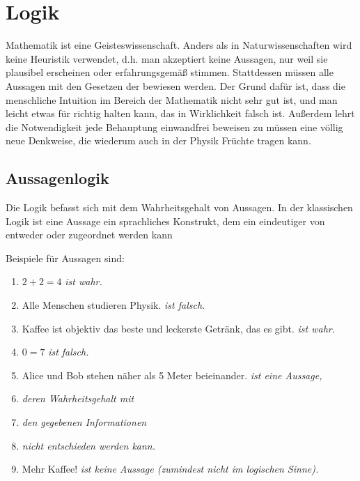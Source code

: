 \chapter{Logik}

Mathematik ist eine Geisteswissenschaft. Anders als in Naturwissenschaften wird keine Heuristik verwendet, d.h. man akzeptiert keine Aussagen, nur weil sie plausibel erscheinen oder erfahrungsgemäß stimmen. Stattdessen müssen alle Aussagen mit den Gesetzen der  bewiesen werden. Der Grund dafür ist, dass die menschliche Intuition im Bereich der Mathematik nicht sehr gut ist, und man leicht etwas für richtig halten kann, das in Wirklichkeit falsch ist. Außerdem lehrt die Notwendigkeit jede Behauptung einwandfrei beweisen zu müssen eine völlig neue Denkweise, die wiederum auch in der Physik Früchte tragen kann.

\section{Aussagenlogik}

Die Logik befasst sich mit dem Wahrheitsgehalt von Aussagen. In der klassischen Logik ist eine Aussage ein sprachliches Konstrukt, dem ein eindeutiger  von entweder  oder  zugeordnet werden kann

\begin{example}[Aussagen]
    Beispiele für Aussagen sind:
    \begin{enumerate}
        \item $2 + 2 = 4$ \hfill \emph{ist wahr.}
        \item Alle Menschen studieren Physik. \hfill \emph{ist falsch.}
        \item Kaffee ist objektiv das beste und leckerste Getränk, das es gibt. \hfill \emph{ist wahr.}
        \item $0 = 7$ \hfill \emph{ist falsch.}
        \item Alice und Bob stehen näher als 5 Meter beieinander. \hfill \emph{ist eine Aussage,}
        \item[] \vspace{-10pt} \hfill \emph{deren Wahrheitsgehalt mit}
        \item[] \vspace{-10pt} \hfill \emph{den gegebenen Informationen}
        \item[] \vspace{-10pt} \hfill \emph{nicht entschieden werden kann.}
        \item Mehr Kaffee! \hfill \emph{ist keine Aussage (zumindest nicht im logischen Sinne).}
    \end{enumerate}
\end{example}

